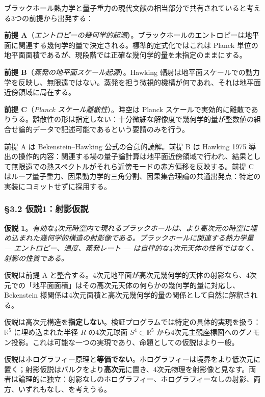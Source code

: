 \documentclass[a4paper,11pt]{ltjsarticle}
\theoremstyle{definition}
\begin{document}
ブラックホール熱力学と量子重力の現代文献の相当部分で共有されていると考える3つの前提から出発する：

\textbf{前提
A}（\emph{エントロピーの幾何学的起源}）。ブラックホールのエントロピーは地平面に関連する幾何学的量で決定される。標準的定式化ではこれは
Planck
単位の地平面面積であるが、現段階では正確な幾何学的量を未指定のままにする。

\textbf{前提 B}（\emph{蒸発の地平面スケール起源}）。Hawking
輻射は地平面スケールでの動力学を反映し、無限遠ではない。蒸発を担う微視的機構が何であれ、それは地平面近傍領域に局在する。

\textbf{前提 C}（\emph{Planck スケール離散性}）。時空は Planck
スケールで実効的に離散でありうる。離散性の形は指定しない：十分微細な解像度で幾何学的量が整数値の組合せ論的データで記述可能であるという要請のみを行う。

前提 A は Bekenstein--Hawking 公式の合意的読解。前提 B は Hawking 1975
導出の操作的内容：関連する場の量子論計算は地平面近傍領域で行われ、結果として無限遠での熱スペクトルがそれら近傍モードの赤方偏移を反映する。前提
C
はループ量子重力、因果動力学的三角分割、因果集合理論の共通出発点：特定の実装にコミットせずに採用する。

\subsubsection{§3.2
仮説1：射影仮説}\label{ux4eeeux8aac1ux5c04ux5f71ux4eeeux8aac}

\textbf{仮説
1}。\emph{有効な4次元時空内で現れるブラックホールは、より高次元の時空に埋め込まれた幾何学的構造の射影像である。ブラックホールに関連する熱力学量
--- エントロピー、温度、蒸発レート ---
は自律的な4次元天体の性質ではなく、射影の性質である。}

仮説は前提 A
と整合する。4次元地平面が高次元幾何学的天体の射影なら、4次元での「地平面面積」はその高次元天体の何らかの幾何学的量に対応し、Bekenstein
様関係は4次元面積と高次元幾何学的量の関係として自然に解釈される。

仮説は高次元構造を\textbf{指定しない}。検証プログラムでは特定の具体的実現を扱う：\(\mathbb{R}^5\)
に埋め込まれた半径 \(R\) の4次元球面 \(S^4 \subset \mathbb{R}^5\)
から4次元主観座標図へのグノモン投影。これは可能な一つの実現であり、命題としての仮説はより一般。

仮説はホログラフィー原理と\textbf{等価でない}。ホログラフィーは境界をより低次元に置く；射影仮説はバルクをより\textbf{高次元}に置き、4次元物理を射影像と見なす。両者は論理的に独立：射影なしのホログラフィー、ホログラフィーなしの射影、両方、いずれもなし、を考えうる。
\end{document}
